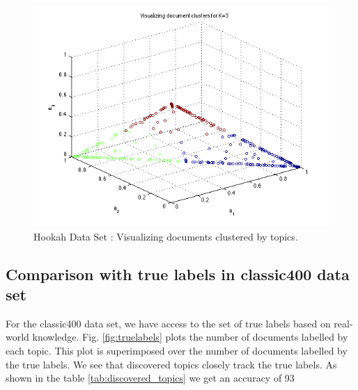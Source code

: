 \documentclass[11pt,a4paper,oneside]{article}
\begin{document}
\begin{figure}[H]
\centering
\includegraphics[width=\columnwidth]{scatter_hookah}
\caption{Hookah Data Set : Visualizing documents clustered by topics.}
\label{fig:scatter_hookah}
\end{figure}

\subsection{Comparison with true labels in classic400 data set}
For the classic400 data set, we have access to the set of true labels based on real-world knowledge. Fig. \ref{fig:truelabels} plots the number of documents labelled by each topic. This plot is superimposed over the number of documents labelled by the true labels. We see that discovered topics closely track the true labels. As shown in the table \ref{tab:discovered_topics} we get an accuracy of 93%
\end{document}
